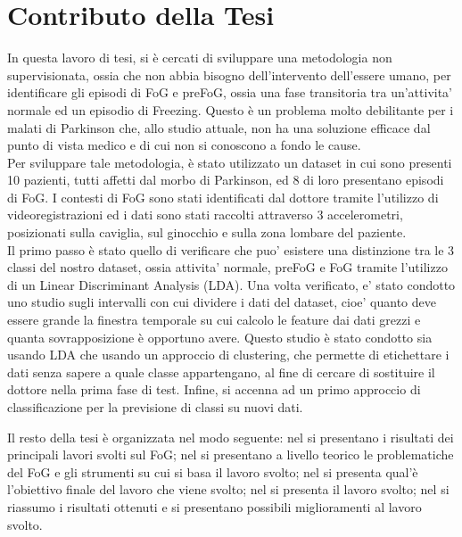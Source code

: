 \section{Contributo della Tesi}\label{cap1:Contributo della Tesi}
In questa lavoro di tesi, si è cercati di sviluppare una metodologia non supervisionata, ossia che non abbia bisogno dell'intervento dell'essere umano, per identificare gli episodi di FoG e preFoG, ossia una fase transitoria tra un'attivita' normale ed un episodio di Freezing. Questo è un problema molto debilitante per i malati di Parkinson che, allo studio attuale, non ha una soluzione efficace dal punto di vista medico e di cui non si conoscono a fondo le cause.\\
Per sviluppare tale metodologia, è stato utilizzato un dataset in cui sono presenti 10 pazienti, tutti affetti dal morbo di Parkinson, ed 8 di loro presentano episodi di FoG. I contesti di FoG sono stati identificati dal dottore tramite l'utilizzo di videoregistrazioni ed i dati sono stati raccolti attraverso 3 accelerometri, posizionati sulla caviglia, sul ginocchio e sulla zona lombare del paziente.\\
Il primo passo è stato quello di verificare che puo' esistere una distinzione tra le 3 classi del nostro dataset, ossia attivita' normale, preFoG e FoG tramite l'utilizzo di un Linear Discriminant Analysis (LDA). Una volta verificato, e' stato condotto uno studio sugli intervalli con cui dividere i dati del dataset, cioe' quanto deve essere grande la finestra temporale su cui calcolo le feature dai dati grezzi e quanta sovrapposizione è opportuno avere. Questo studio è stato condotto sia usando LDA che usando un approccio di clustering, che permette di etichettare i dati senza sapere a quale classe appartengano, al fine di cercare di sostituire il dottore nella prima fase di test. Infine, si accenna ad un primo approccio di classificazione per la previsione di classi su nuovi dati.


Il resto della tesi è organizzata nel modo seguente: nel \textbf{} si presentano i risultati dei principali lavori svolti sul FoG; nel \textbf{} si presentano a livello teorico le problematiche del FoG e gli strumenti su cui si basa il lavoro svolto; nel \textbf{} si presenta qual'è l'obiettivo finale del lavoro che viene svolto; nel \textbf{} si presenta il lavoro svolto; nel \textbf{} si riassumo i risultati ottenuti e si presentano possibili miglioramenti al lavoro svolto.
 
